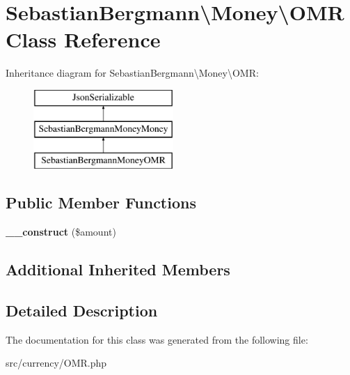 \hypertarget{classSebastianBergmann_1_1Money_1_1OMR}{}\section{Sebastian\+Bergmann\textbackslash{}Money\textbackslash{}O\+M\+R Class Reference}
\label{classSebastianBergmann_1_1Money_1_1OMR}
Inheritance diagram for Sebastian\+Bergmann\textbackslash{}Money\textbackslash{}O\+M\+R\+:\begin{figure}[H]
\begin{center}
\leavevmode
\includegraphics[height=3.000000cm]{classSebastianBergmann_1_1Money_1_1OMR}
\end{center}
\end{figure}
\subsection*{Public Member Functions}
\begin{DoxyCompactItemize}
\item 
\hypertarget{classSebastianBergmann_1_1Money_1_1OMR_aab0bcfca3ad6fac31bea2d05e4063433}{}{\bfseries \+\_\+\+\_\+construct} (\$amount)\label{classSebastianBergmann_1_1Money_1_1OMR_aab0bcfca3ad6fac31bea2d05e4063433}

\end{DoxyCompactItemize}
\subsection*{Additional Inherited Members}


\subsection{Detailed Description}


The documentation for this class was generated from the following file\+:\begin{DoxyCompactItemize}
\item 
src/currency/O\+M\+R.\+php\end{DoxyCompactItemize}
